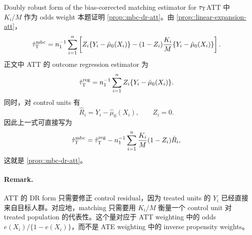 \begin{exercisesolution}{Doubly robust form of the bias-corrected matching estimator for $\tau_\textsc{T}$}{ATT 中 $K_i/M$ 作为 odds weight}
本题证明 \cref{prop::mbc-dr-att}。由 \cref{prop::linear-expansion-att}，
\[
\hat\tau_\textsc{T}^{\textup{mbc}}
=n_1^{-1}\sum_{i=1}^n
\left[
Z_i\{Y_i-\hat\mu_0(X_i)\}
-(1-Z_i){K_i\over M}\{Y_i-\hat\mu_0(X_i)\}
\right].
\]
正文中 ATT 的 outcome regression estimator 为
\[
\hat\tau_{\textsc{T}}^{\textup{reg}}
=n_1^{-1}\sum_{i=1}^n Z_i\{Y_i-\hat\mu_0(X_i)\}.
\]
同时，对 control units 有
\[
\hat R_i=Y_i-\hat\mu_0(X_i),\qquad Z_i=0.
\]
因此上一式可直接写为
\[
\hat\tau_\textsc{T}^{\textup{mbc}}
=\hat\tau_{\textsc{T}}^{\textup{reg}}
-n_1^{-1}\sum_{i=1}^n {K_i\over M}(1-Z_i)\hat R_i,
\]
这就是 \cref{prop::mbc-dr-att}。

\paragraph{Remark.}
ATT 的 DR form 只需要修正 control residual，因为 treated units 的 $Y_i$ 已经直接来自目标人群。对应地，matching 只需要用 $K_i/M$ 衡量一个 control unit 对 treated population 的代表性。这个量对应于 ATT weighting 中的 odds $e(X_i)/\{1-e(X_i)\}$，而不是 ATE weighting 中的 inverse propensity weights。
\end{exercisesolution}

